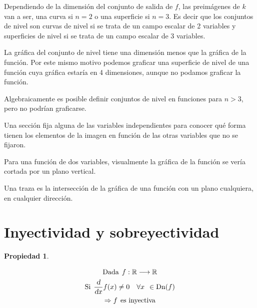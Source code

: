 \documentclass[a5paper,12pt,twoside]{book}
\newtheorem{prop}{{Propiedad}}[chapter]
\begin{document}
Dependiendo de la dimensión del conjunto de salida de $f$, las preimágenes de $k$ van a ser, una curva si $n=2$ o una superficie si $n=3$. Es decir que los conjuntos de nivel son curvas de nivel si se trata de un campo escalar de 2 variables y superficies de nivel si se trata de un campo escalar de 3 variables.

La gráfica del conjunto de nivel tiene una dimensión menos que la gráfica de la función. Por este mismo motivo podemos graficar una superficie de nivel de una función cuya gráfica estaría en 4 dimensiones, aunque no podamos graficar la función.

Algebraicamente es posible definir conjuntos de nivel en funciones para $n>3$, pero no podrían graficarse.



Una sección fija alguna de las variables independientes para conocer qué forma tienen los elementos de la imagen en función de las otras variables que no se fijaron.

Para una función de dos variables, visualmente la gráfica de la función se vería cortada por un plano vertical.



Una traza es la intersección de la gráfica de una función con un plano cualquiera, en cualquier dirección.


\section{Inyectividad y sobreyectividad}

\begin{mdframed}[style=MyFrame1]
    \begin{prop}
    \end{prop}
    \begin{gather*}
        \textrm{Dada} \hspace{1ex} f: \mathbb{R} \longrightarrow \mathbb{R}
        \\
        \textrm{Si} \hspace{1ex} \frac{\textsl{d}}{\textsl{d} x} f(x) \neq 0 \quad \forall x \hspace{1ex} \in \operatorname{Dn}(f)
        \\
        \Rightarrow f \hspace{1ex} \textrm{es inyectiva}
    \end{gather*}
\end{mdframed}
\end{document}
